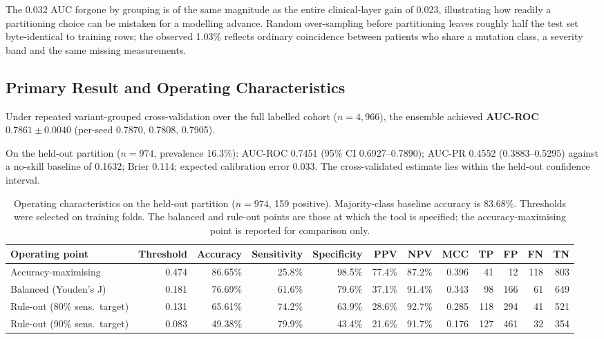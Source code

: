 \documentclass[conference]{IEEEtran}
\begin{document}
The 0.032 AUC forgone by grouping is of the same magnitude as the entire
clinical-layer gain of 0.023, illustrating how readily a partitioning choice
can be mistaken for a modelling advance. Random over-sampling before
partitioning leaves roughly half the test set byte-identical to training rows;
the observed 1.03\% reflects ordinary coincidence between patients who share a
mutation class, a severity band and the same missing measurements.

\subsection{Primary Result and Operating Characteristics}
Under repeated variant-grouped cross-validation over the full labelled cohort
($n = 4{,}966$), the ensemble achieved \textbf{AUC-ROC $0.7861 \pm 0.0040$}
(per-seed 0.7870, 0.7808, 0.7905).

On the held-out partition ($n = 974$, prevalence 16.3\%): AUC-ROC 0.7451
(95\% CI 0.6927--0.7890); AUC-PR 0.4552 (0.3883--0.5295) against a no-skill
baseline of 0.1632; Brier 0.114; expected calibration error 0.033. The
cross-validated estimate lies within the held-out confidence interval.

\begin{table}[!t]
\caption{Operating characteristics on the held-out partition ($n = 974$, 159
positive). Majority-class baseline accuracy is 83.68\%. Thresholds were
selected on training folds. The balanced and rule-out points are those at which
the tool is specified; the accuracy-maximising point is reported for comparison
only.}
\label{tab:operating}
\centering
\footnotesize
\begin{tabular}{lrrrrrrrrrrr}
\toprule
Operating point & Threshold & Accuracy & Sensitivity & Specificity & PPV & NPV & MCC & TP & FP & FN & TN \\
\midrule
Accuracy-maximising          & 0.474 & 86.65\% & 25.8\% & 98.5\% & 77.4\% & 87.2\% & 0.396 & 41  & 12  & 118 & 803 \\
Balanced (Youden's J)        & 0.181 & 76.69\% & 61.6\% & 79.6\% & 37.1\% & 91.4\% & 0.343 & 98  & 166 & 61  & 649 \\
Rule-out (80\% sens.\ target)& 0.131 & 65.61\% & 74.2\% & 63.9\% & 28.6\% & 92.7\% & 0.285 & 118 & 294 & 41  & 521 \\
Rule-out (90\% sens.\ target)& 0.083 & 49.38\% & 79.9\% & 43.4\% & 21.6\% & 91.7\% & 0.176 & 127 & 461 & 32  & 354 \\
\bottomrule
\end{tabular}
\end{table}
\end{document}
